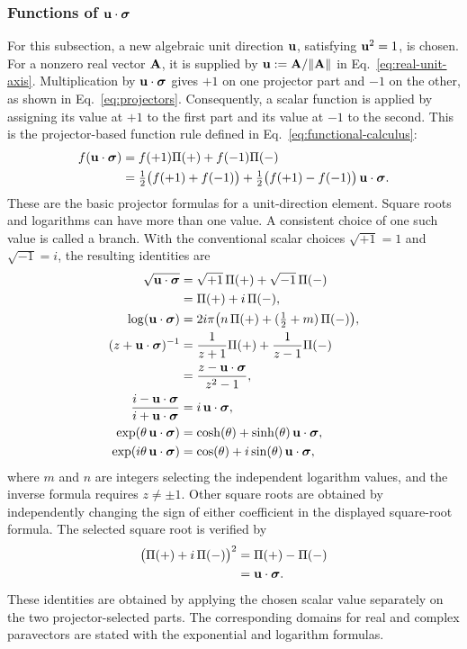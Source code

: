 \subsubsection{Functions of \texorpdfstring{\(\mathbf{u}\cdot\mathbf{\bm{\sigma}}\)}{u.sigma}}
For this subsection, a new algebraic unit direction \(\mathbf{u}\), satisfying
\(\mathbf{u}^2=1\), is chosen. For a nonzero real vector
\(\mathbf{A}\), it is supplied by
\(\mathbf{u}:=\mathbf{A}/\|\mathbf{A}\|\) in Eq.\ \eqref{eq:real-unit-axis}.
Multiplication by \(\mathbf{u}\cdot\mathbf{\bm{\sigma}}\) gives \(+1\) on one projector
part and \(-1\) on the other, as shown in Eq.\ \eqref{eq:projectors}.
Consequently, a scalar function is applied by assigning its value at \(+1\)
to the first part and its value at \(-1\) to the second. This is the
projector-based function rule defined in Eq.\ \eqref{eq:functional-calculus}:
\begin{align*}
f(\mathbf{u}\cdot\mathbf{\bm{\sigma}})
&= f(+1)\Pi(+) + f(-1)\Pi(-)\notag \\
&= \tfrac{1}{2}\bigl(f(+1)+f(-1)\bigr)
+ \tfrac{1}{2}\bigl(f(+1)-f(-1)\bigr)\,\mathbf{u}\cdot\mathbf{\bm{\sigma}}.
\end{align*}
These are the basic projector formulas for a unit-direction element.
Square roots and logarithms can have more than one value. A consistent
choice of one such value is called a branch. With the conventional scalar
choices \(\sqrt{+1}=1\) and \(\sqrt{-1}=i\), the resulting identities are
\begin{align*}
\sqrt{\mathbf{u}\cdot\mathbf{\bm{\sigma}}}
&= \sqrt{+1}\,\Pi(+)+\sqrt{-1}\,\Pi(-)\notag\\
&= \Pi(+) + i\,\Pi(-), \\
\log(\mathbf{u}\cdot\mathbf{\bm{\sigma}})
&= 2 i \pi\bigl(n\,\Pi(+) + (\tfrac12+m)\,\Pi(-)\bigr), \\
(z+\mathbf{u}\cdot\mathbf{\bm{\sigma}})^{-1}
&= \frac{1}{z+1}\Pi(+) + \frac{1}{z-1}\Pi(-)\notag \\
&= \frac{z-\mathbf{u}\cdot\mathbf{\bm{\sigma}}}{z^{2}-1}, \\
\frac{i-\mathbf{u}\cdot\mathbf{\bm{\sigma}}}{i+\mathbf{u}\cdot\mathbf{\bm{\sigma}}}
&= i\,\mathbf{u}\cdot\mathbf{\bm{\sigma}}, \\
\exp(\theta\,\mathbf{u}\cdot\mathbf{\bm{\sigma}})
&= \cosh(\theta)+\sinh(\theta)\,\mathbf{u}\cdot\mathbf{\bm{\sigma}}, \\
\exp(i\theta\,\mathbf{u}\cdot\mathbf{\bm{\sigma}})
&= \cos(\theta)+i\sin(\theta)\,\mathbf{u}\cdot\mathbf{\bm{\sigma}},
\end{align*}
where \(m\) and \(n\) are integers selecting the independent logarithm
values, and the inverse formula requires \(z\neq\pm1\). Other square roots
are obtained by independently changing the sign of either coefficient in
the displayed square-root formula. The selected square root is verified by
\begin{align*}
\bigl(\Pi(+)+i\,\Pi(-)\bigr)^2
&=\Pi(+)-\Pi(-)\notag\\
&=\mathbf{u}\cdot\mathbf{\bm{\sigma}}.
\end{align*}
These identities are obtained by applying the chosen scalar value separately
on the two projector-selected parts.
The corresponding domains for real and complex paravectors are stated with
the exponential and logarithm formulas.

